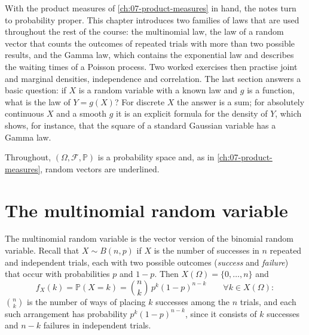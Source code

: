
With the product measures of \cref{ch:07-product-measures} in hand, the notes turn to
probability proper. This chapter introduces two families of laws that are used throughout the
rest of the course: the multinomial law, the law of a random vector that counts the outcomes of
repeated trials with more than two possible results, and the Gamma law, which contains the
exponential law and describes the waiting times of a Poisson process. Two worked exercises then
practise joint and marginal densities, independence and correlation. The last section answers a
basic question: if $X$ is a random variable with a known law and $g$ is a function, what is the law
of $Y=g(X)$? For discrete $X$ the answer is a sum; for absolutely continuous $X$ and a smooth $g$
it is an explicit formula for the density of $Y$, which shows, for instance, that the square of a
standard Gaussian variable has a Gamma law.

Throughout, $(\Omega,\mathcal F,\mathbb P)$ is a probability space and, as in
\cref{ch:07-product-measures}, random vectors are underlined.

\section{The multinomial random variable}\label{sec:tr-multinomial}

The multinomial random variable is the vector version of the binomial random variable. Recall
that $X\sim B(n,p)$ if $X$ is the number of successes in $n$ repeated and independent trials,
each with two possible outcomes (\emph{success} and \emph{failure}) that occur with probabilities
$p$ and $1-p$. Then $X(\Omega)=\{0,\dots,n\}$ and
\[
  f_X(k)=\mathbb P(X=k)=\binom nk\,p^k(1-p)^{n-k}\qquad\forall k\in X(\Omega):
\]
$\binom nk$ is the number of ways of placing $k$ successes among the $n$ trials, and each such
arrangement has probability $p^k(1-p)^{n-k}$, since it consists of $k$ successes and $n-k$
failures in independent trials.

